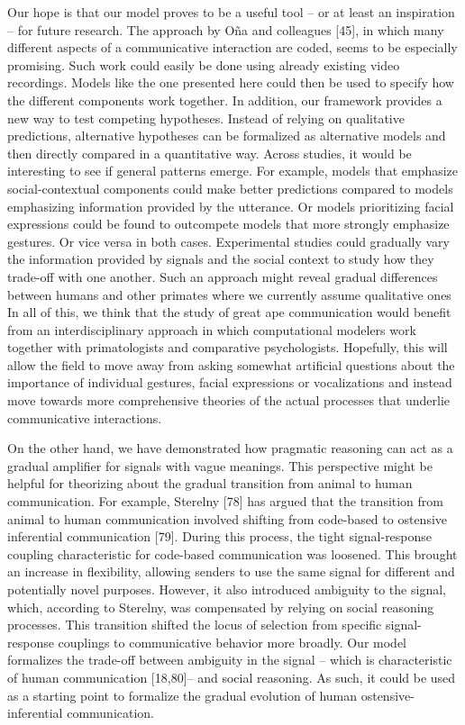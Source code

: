 \documentclass[
  english,
  man,floatsintext]{apa6}
\begin{document}
Our hope is that our model proves to be a useful tool -- or at least an inspiration -- for future research. The approach by Oña and colleagues {[}45{]}, in which many different aspects of a communicative interaction are coded, seems to be especially promising. Such work could easily be done using already existing video recordings. Models like the one presented here could then be used to specify how the different components work together. In addition, our framework provides a new way to test competing hypotheses. Instead of relying on qualitative predictions, alternative hypotheses can be formalized as alternative models and then directly compared in a quantitative way. Across studies, it would be interesting to see if general patterns emerge. For example, models that emphasize social-contextual components could make better predictions compared to models emphasizing information provided by the utterance. Or models prioritizing facial expressions could be found to outcompete models that more strongly emphasize gestures. Or vice versa in both cases. Experimental studies could gradually vary the information provided by signals and the social context to study how they trade-off with one another. Such an approach might reveal gradual differences between humans and other primates where we currently assume qualitative ones In all of this, we think that the study of great ape communication would benefit from an interdisciplinary approach in which computational modelers work together with primatologists and comparative psychologists. Hopefully, this will allow the field to move away from asking somewhat artificial questions about the importance of individual gestures, facial expressions or vocalizations and instead move towards more comprehensive theories of the actual processes that underlie communicative interactions.

On the other hand, we have demonstrated how pragmatic reasoning can act as a gradual amplifier for signals with vague meanings. This perspective might be helpful for theorizing about the gradual transition from animal to human communication. For example, Sterelny {[}78{]} has argued that the transition from animal to human communication involved shifting from code-based to ostensive inferential communication {[}79{]}. During this process, the tight signal-response coupling characteristic for code-based communication was loosened. This brought an increase in flexibility, allowing senders to use the same signal for different and potentially novel purposes. However, it also introduced ambiguity to the signal, which, according to Sterelny, was compensated by relying on social reasoning processes. This transition shifted the locus of selection from specific signal-response couplings to communicative behavior more broadly. Our model formalizes the trade-off between ambiguity in the signal -- which is characteristic of human communication {[}18,80{]}-- and social reasoning. As such, it could be used as a starting point to formalize the gradual evolution of human ostensive-inferential communication.
\end{document}
